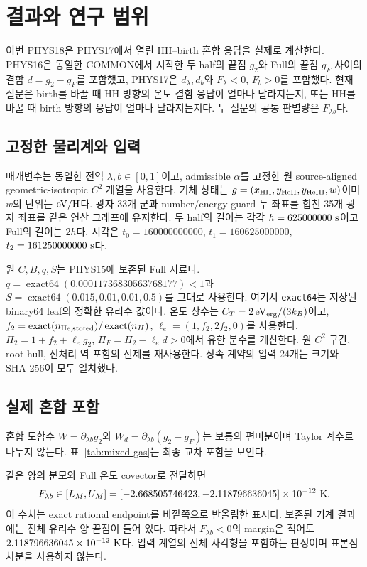 \section{결과와 연구 범위}

이번 PHYS18은 PHYS17에서 열린 HH--birth 혼합 응답을 실제로 계산한다.
PHYS16은 동일한 COMMON에서 시작한 두 half의 끝점 $g_2$와 Full의 끝점
$g_F$ 사이의 결함 $d=g_2-g_F$를 포함했고, PHYS17은
$d_\lambda,d_b$와 $F_\lambda<0$, $F_b>0$를 포함했다.
현재 질문은 birth를 바꿀 때 HH 방향의 온도 결함 응답이 얼마나 달라지는지,
또는 HH를 바꿀 때 birth 방향의 응답이 얼마나 달라지는지다.
두 질문의 공통 판별량은 $F_{\lambda b}$다.

\subsection{고정한 물리계와 입력}

매개변수는 동일한 전역 $\lambda,b\in[0,1]$이고, admissible $\alpha$를
고정한 원 source-aligned geometric-isotropic $C^2$ 계열을 사용한다.
기체 상태는 $g=(x_{\rm HII},y_{\rm HeII},y_{\rm HeIII},w)$이며
$w$의 단위는 ${\rm eV/H}$다. 광자 33개 군과 number/energy guard 두
좌표를 합친 35개 광자 좌표를 같은 연산 그래프에 유지한다.
두 half의 길이는 각각 $h=625000000\ {\rm s}$이고 Full의 길이는 $2h$다.
시각은 $t_0=160000000000$, $t_1=160625000000$,
$t_2=161250000000\ {\rm s}$다.

원 $C,B,q,S$는 PHYS15에 보존된 Full 자료다.
$q=\operatorname{exact64}(0.00011736830563768177)<1$과
$S=\operatorname{exact64}(0.015,0.01,0.01,0.5)$를 그대로 사용한다.
여기서 \texttt{exact64}는 저장된 binary64 leaf의 정확한 유리수 값이다.
온도 상수는 $C_T=2\,\mathrm{eV}_{\rm erg}/(3k_B)$이고,
$f_2=\operatorname{exact}(n_{\rm He,stored})/\operatorname{exact}(n_H)$,
$\ell_e=(1,f_2,2f_2,0)$를 사용한다.
$\Pi_2=1+f_2+\ell_e g_2$, $\Pi_F=\Pi_2-\ell_e d>0$에서 유한 분수를
계산한다. 원 $C^2$ 구간, root hull, 전처리 역 포함의 전제를 재사용한다.
상속 계약의 입력 24개는 크기와 SHA-256이 모두 일치했다.

\subsection{실제 혼합 포함}

혼합 도함수 $W=\partial_{\lambda b}g_2$와
$W_d=\partial_{\lambda b}(g_2-g_F)$는 보통의 편미분이며 Taylor 계수로
나누지 않는다. 표~\ref{tab:mixed-gas}는 최종 교차 포함을 보인다.



같은 양의 분모와 Full 온도 covector로 전달하면
\begin{equation}
 F_{\lambda b}\in[L_M,U_M]
 =[-2.668505746423,-2.118796636045]\times10^{-12}\ {\rm K}.
 \label{eq:main-mixed}
\end{equation}
이 수치는 exact rational endpoint를 바깥쪽으로 반올림한 표시다.
보존된 기계 결과에는 전체 유리수 양 끝점이 들어 있다.
따라서 $F_{\lambda b}<0$의 margin은 적어도 $2.118796636045\times10^{-12}\ {\rm K}$다.
입력 계열의 전체 사각형을 포함하는 판정이며 표본점 차분을 사용하지 않는다.

